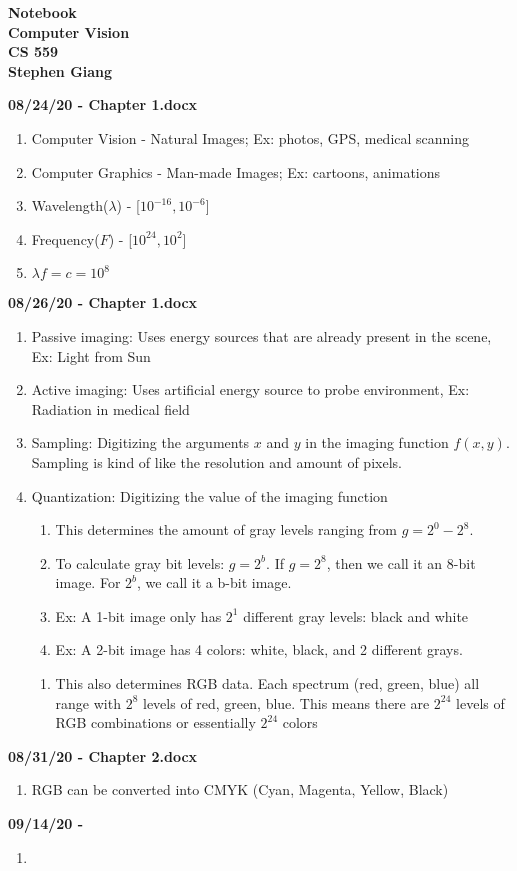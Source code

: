 \documentclass[11pt]{article}
\newcommand{\skipline}{\vspace{\baselineskip}}
\begin{document}
	
	\begin{center}
		\textbf{Notebook} \\
		\textbf{Computer Vision} \\
		\textbf{CS 559} \\
		\textbf{Stephen Giang} \\
	\end{center}
	
	\textbf{08/24/20 - Chapter 1.docx}
	\begin{enumerate}
		\item Computer Vision - Natural Images; Ex: photos, GPS, medical scanning
		\item Computer Graphics - Man-made Images; Ex: cartoons, animations
		\item Wavelength($\lambda$) - [$10^{-16}, 10^{-6}$] 
		\item Frequency($F$) - [$10^{24}, 10^{2}$]
		\item $\lambda f = c = 10^{8}$
	\end{enumerate}
	\skipline
	\textbf{08/26/20 - Chapter 1.docx}
	\begin{enumerate}
		\item Passive imaging: Uses energy sources that are already present in the scene, Ex: Light from Sun
		\item Active imaging: Uses artificial energy source to probe environment, Ex: Radiation in medical field 
		\item Sampling: Digitizing the arguments $x$ and $y$ in the imaging function $f(x,y)$.  Sampling is kind of like the resolution and amount of pixels.
		\item Quantization: Digitizing the value of the imaging function
			\begin{enumerate}
				\item This determines the amount of gray levels ranging from $g = 2^0 - 2^8$. 
				\item To calculate gray bit levels: $g = 2^b$.  If $g = 2^8$, then we call it an 8-bit image.  For $2^b$, we call it a b-bit image.  
				\item Ex: A 1-bit image only has $2^1$ different gray levels: black and white
				\item Ex: A 2-bit image has 4 colors: white, black, and 2 different grays.
			\end{enumerate}
			\skipline
			\begin{enumerate}
				\item This also determines RGB data.  Each spectrum (red, green, blue) all range with $2^8$ levels of red, green, blue.  This means there are $2^{24}$ levels of RGB combinations or essentially $2^{24}$ colors  
			\end{enumerate}
	\end{enumerate}
	\skipline
	\textbf{08/31/20 - Chapter 2.docx}
	\begin{enumerate}
		\item RGB can be converted into CMYK (Cyan, Magenta, Yellow, Black)
	\end{enumerate}
	\skipline
	\textbf{09/14/20 - }
	\begin{enumerate}
		\item 
	\end{enumerate}
\end{document}
